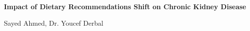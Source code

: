 \begin{center}
\textbf{Impact of Dietary Recommendations Shift on  Chronic Kidney Disease}

\medskip
Sayed Ahmed, Dr. Youcef Derbal
\end{center}